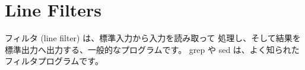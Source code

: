 \section{Line Filters}

フィルタ (line filter) は、標準入力から入力を読み取って 処理し、そして結果を標準出力へ出力する、一般的なプログラムです。 grep や sed は、よく知られたフィルタプログラムです。




